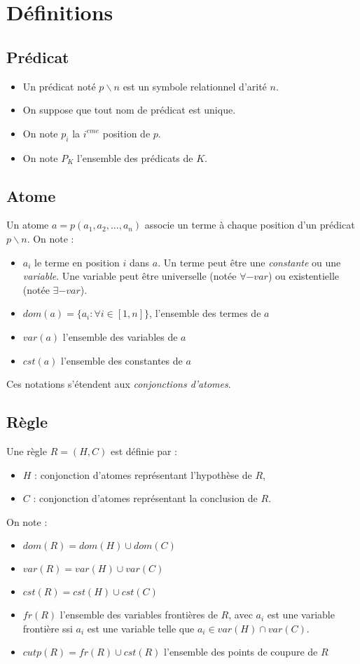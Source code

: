 \section{D\'efinitions}

\subsection{Pr\'edicat}
	\begin{itemize}
		\item Un pr\'edicat not\'e $p \backslash n$ est un symbole relationnel d'arit\'e $n$.
		\item On suppose que tout nom de pr\'edicat est unique.
		\item On note $p_{i}$ la $i^{eme}$ position de $p$.
		\item On note $P_{K}$ l'ensemble des pr\'edicats de $K$.
	\end{itemize}

\subsection{Atome}
	Un atome $a = p(a_{1},a_{2},...,a_{n})$ associe un terme \`a chaque position d'un pr\'edicat $p \backslash n$.
	On note :
	\begin{itemize}
		\item $a_{i}$ le terme en position $i$ dans $a$. Un terme peut \^etre une {\em constante} ou une {\em variable}.
		Une variable peut \^etre universelle (not\'ee $\forall-var$) ou existentielle (not\'ee $\exists-var$).
		\item $dom(a) = \{a_{i} : \forall i \in [1,n]\}$, l'ensemble des termes de $a$
		\item $var(a)$ l'ensemble des variables de $a$
		\item $cst(a)$ l'ensemble des constantes de $a$
	\end{itemize}
	Ces notations s'\'etendent aux {\em conjonctions d'atomes}.

\subsection{R\`egle}
	Une r\`egle $R = (H,C)$ est d\'efinie par :
	\begin{itemize}
		\item $H$ : conjonction d'atomes repr\'esentant l'hypoth\`ese de $R$,
		\item $C$ : conjonction d'atomes repr\'esentant la conclusion de $R$.
	\end{itemize}
	On note :
	\begin{itemize}
		\item $dom(R) = dom(H) \cup dom(C)$
		\item $var(R) = var(H) \cup var(C)$
		\item $cst(R) = cst(H) \cup cst(C)$
		\item $fr(R)$ l'ensemble des variables fronti\`eres de $R$, avec $a_{i}$ est une variable fronti\`ere ssi $a_{i}$ est une variable telle que $a_{i} \in var(H) \cap var(C)$.
		\item $cutp(R) = fr(R) \cup cst(R)$ l'ensemble des points de coupure de $R$
	\end{itemize}

